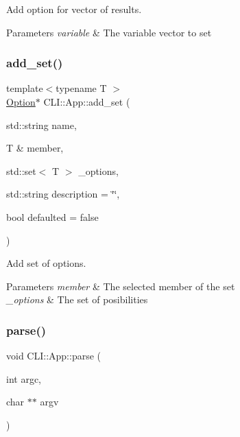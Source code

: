 Add option for vector of results. 


\begin{DoxyParams}{Parameters}
{\em variable} & The variable vector to set \\
\hline
\end{DoxyParams}
\mbox{\label{class_c_l_i_1_1_app_a97a0355faf6b17bdb1f5f34b1371eaac}} 
\subsubsection{\texorpdfstring{add\+\_\+set()}{add\_set()}}
{\footnotesize\ttfamily template$<$typename T $>$ \\
\hyperlink{class_c_l_i_1_1_option}{Option}$\ast$ C\+L\+I\+::\+App\+::add\+\_\+set (\begin{DoxyParamCaption}\item[{std\+::string}]{name,  }\item[{T \&}]{member,  }\item[{std\+::set$<$ T $>$}]{\+\_\+options,  }\item[{std\+::string}]{description = {\ttfamily \char`\"{}\char`\"{}},  }\item[{bool}]{defaulted = {\ttfamily false} }\end{DoxyParamCaption})\hspace{0.3cm}{\ttfamily [inline]}}



Add set of options. 


\begin{DoxyParams}{Parameters}
{\em member} & The selected member of the set \\
\hline
{\em \+\_\+options} & The set of posibilities \\
\hline
\end{DoxyParams}
\mbox{\label{class_c_l_i_1_1_app_ab1b5f580b80240cd54f00386be4fa08f}} 
\subsubsection{\texorpdfstring{parse()}{parse()}}
{\footnotesize\ttfamily void C\+L\+I\+::\+App\+::parse (\begin{DoxyParamCaption}\item[{int}]{argc,  }\item[{char $\ast$$\ast$}]{argv }\end{DoxyParamCaption})\hspace{0.3cm}{\ttfamily [inline]}}

